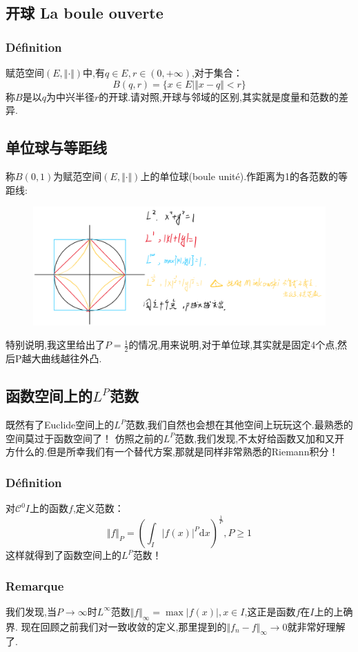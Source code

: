 \documentclass[12pt, a4paper, oneside]{ctexbook}
\newcommand{\C }{\mathcal{C}}%
\begin{document}
  \subsection{开球 La boule ouverte}
  \subsubsection{Définition}
  赋范空间$(E,\Vert \cdot \Vert)$中,有$q\in E,r\in(0,+\infty)$,对于集合：
  $$
    B(q,r)=\{x\in E |\Vert x-q \Vert<r \}
  $$
  称$B$是以$q$为中兴半径$r$的开球.请对照,开球与邻域的区别,其实就是度量和范数的差异.
  \subsection{单位球与等距线}
  称$B(0,1)$为赋范空间$(E,\Vert \cdot \Vert)$上的单位球(boule unité).作距离为1的各范数的等距线:
  \begin{figure}[H]%
    \centering
    \includegraphics[scale=0.6]{danweiqiu.png}
    \label{fig:1}
  \end{figure}
  特别说明,我这里给出了$P=\frac{1}{2}$的情况,用来说明,对于单位球,其实就是固定4个点,然后P越大曲线越往外凸.
  \subsection{函数空间上的$L^P$范数}
  既然有了Euclide空间上的$L^P$范数,我们自然也会想在其他空间上玩玩这个.最熟悉的空间莫过于函数空间了！
  仿照之前的$L^P$范数,我们发现,不太好给函数又加和又开方什么的.但是所幸我们有一个替代方案,那就是同样非常熟悉的Riemann积分！
  \subsubsection{Définition}
  对$\C ^0I$上的函数$f$,定义范数：
  $$
  \Vert f \Vert_P=(\int_{I}|f(x)|^P \mathrm{d} x)^{\frac{1}{P}},P\ge1
  $$
  这样就得到了函数空间上的$L^P$范数！
  \subsubsection{Remarque}
  我们发现,当$P\rightarrow \infty$时$L^\infty$范数$\Vert f \Vert_\infty=\max|f(x)|,x\in I$,这正是函数$f$在$I$上的上确界.
  现在回顾之前我们对一致收敛的定义,那里提到的$\Vert f_n-f \Vert_\infty\rightarrow 0$就非常好理解了.
\end{document}
